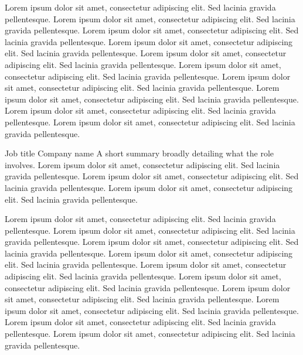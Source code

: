 \documentclass[a4paper]{ReadableCV}
\begin{document}
{Lorem ipsum dolor sit amet, consectetur adipiscing elit. Sed lacinia gravida pellentesque. Lorem ipsum dolor sit amet, consectetur adipiscing elit. Sed lacinia gravida pellentesque.}
{Lorem ipsum dolor sit amet, consectetur adipiscing elit. Sed lacinia gravida pellentesque. Lorem ipsum dolor sit amet, consectetur adipiscing elit. Sed lacinia gravida pellentesque.}
{Lorem ipsum dolor sit amet, consectetur adipiscing elit. Sed lacinia gravida pellentesque. Lorem ipsum dolor sit amet, consectetur adipiscing elit. Sed lacinia gravida pellentesque.}
{Lorem ipsum dolor sit amet, consectetur adipiscing elit. Sed lacinia gravida pellentesque. Lorem ipsum dolor sit amet, consectetur adipiscing elit. Sed lacinia gravida pellentesque.}
{Lorem ipsum dolor sit amet, consectetur adipiscing elit. Sed lacinia gravida pellentesque. Lorem ipsum dolor sit amet, consectetur adipiscing elit. Sed lacinia gravida pellentesque.}

{Job title}
{Company name}
{A short summary broadly detailing what the role involves. Lorem ipsum dolor sit amet, consectetur adipiscing elit. Sed lacinia gravida pellentesque. Lorem ipsum dolor sit amet, consectetur adipiscing elit. Sed lacinia gravida pellentesque. Lorem ipsum dolor sit amet, consectetur adipiscing elit. Sed lacinia gravida pellentesque.}

{Lorem ipsum dolor sit amet, consectetur adipiscing elit. Sed lacinia gravida pellentesque. Lorem ipsum dolor sit amet, consectetur adipiscing elit. Sed lacinia gravida pellentesque.}
{Lorem ipsum dolor sit amet, consectetur adipiscing elit. Sed lacinia gravida pellentesque. Lorem ipsum dolor sit amet, consectetur adipiscing elit. Sed lacinia gravida pellentesque.}
{Lorem ipsum dolor sit amet, consectetur adipiscing elit. Sed lacinia gravida pellentesque. Lorem ipsum dolor sit amet, consectetur adipiscing elit. Sed lacinia gravida pellentesque.}
{Lorem ipsum dolor sit amet, consectetur adipiscing elit. Sed lacinia gravida pellentesque. Lorem ipsum dolor sit amet, consectetur adipiscing elit. Sed lacinia gravida pellentesque.}
{Lorem ipsum dolor sit amet, consectetur adipiscing elit. Sed lacinia gravida pellentesque. Lorem ipsum dolor sit amet, consectetur adipiscing elit. Sed lacinia gravida pellentesque.}
\end{document}
